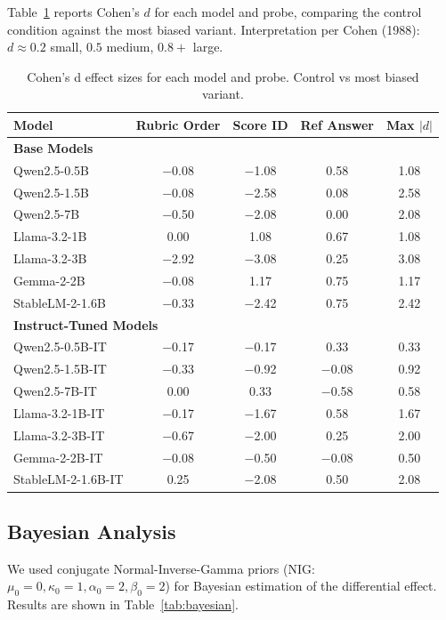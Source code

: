 Table~\ref{tab:cohens_d} reports Cohen's $d$ for each model and probe, comparing the control condition against the most biased variant. Interpretation per Cohen (1988): $d \approx 0.2$ small, $0.5$ medium, $0.8+$ large.

\begin{table}[h]
\centering\small
\caption{Cohen's d effect sizes for each model and probe. Control vs most biased variant.}
\label{tab:cohens_d}
\begin{tabular}{lcccc}
\toprule
\textbf{Model} & \textbf{Rubric Order} & \textbf{Score ID} & \textbf{Ref Answer} & \textbf{Max $|d|$} \\
\midrule
\multicolumn{5}{l}{\textbf{Base Models}} \\
\midrule
Qwen2.5-0.5B & $-$0.08 & $-$1.08 & 0.58 & 1.08 \\
Qwen2.5-1.5B & $-$0.08 & $-$2.58 & 0.08 & 2.58 \\
Qwen2.5-7B & $-$0.50 & $-$2.08 & 0.00 & 2.08 \\
Llama-3.2-1B & 0.00 & 1.08 & 0.67 & 1.08 \\
Llama-3.2-3B & $-$2.92 & $-$3.08 & 0.25 & 3.08 \\
Gemma-2-2B & $-$0.08 & 1.17 & 0.75 & 1.17 \\
StableLM-2-1.6B & $-$0.33 & $-$2.42 & 0.75 & 2.42 \\
\midrule
\multicolumn{5}{l}{\textbf{Instruct-Tuned Models}} \\
\midrule
Qwen2.5-0.5B-IT & $-$0.17 & $-$0.17 & 0.33 & 0.33 \\
Qwen2.5-1.5B-IT & $-$0.33 & $-$0.92 & $-$0.08 & 0.92 \\
Qwen2.5-7B-IT & 0.00 & 0.33 & $-$0.58 & 0.58 \\
Llama-3.2-1B-IT & $-$0.17 & $-$1.67 & 0.58 & 1.67 \\
Llama-3.2-3B-IT & $-$0.67 & $-$2.00 & 0.25 & 2.00 \\
Gemma-2-2B-IT & $-$0.08 & $-$0.50 & $-$0.08 & 0.50 \\
StableLM-2-1.6B-IT & 0.25 & $-$2.08 & 0.50 & 2.08 \\
\bottomrule
\end{tabular}
\end{table}

\subsection{Bayesian Analysis}

We used conjugate Normal-Inverse-Gamma priors (NIG: $\mu_0=0, \kappa_0=1, \alpha_0=2, \beta_0=2$) for Bayesian estimation of the differential effect. Results are shown in Table~\ref{tab:bayesian}.

